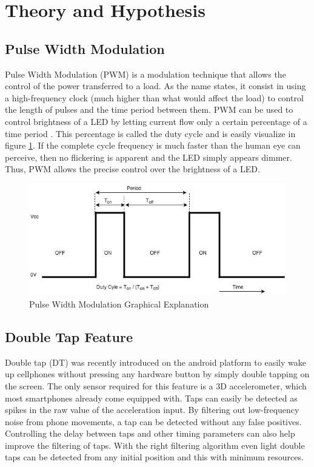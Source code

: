 \documentclass[12pt]{article}
\begin{document}
\section{Theory and Hypothesis}
\subsection{Pulse Width Modulation}
Pulse Width Modulation (PWM) is a modulation technique that allows the control of the power transferred to a load. As the name states, it consist in using a high-frequency clock (much higher than what would affect the load) to control the length of pulses and the time period between them. PWM can be used to control brightness of a LED by letting current flow only a certain percentage of a time period \cite{PWMLED}. This percentage is called the duty cycle and is easily visualize in figure \ref{fig:pwm}. If the complete cycle frequency is much faster than the human eye can perceive, then no flickering is apparent and the LED simply appears dimmer. Thus, PWM allows the precise control over the brightness of a LED.

\begin{figure}[!htb]
  \centering
  \includegraphics[scale=0.65]{images/PWM.png}
  \caption{Pulse Width Modulation Graphical Explanation}
  \label{fig:pwm}
 \end{figure}

\subsection{Double Tap Feature}
Double tap (DT) was recently introduced on the android platform to easily wake up cellphones without pressing any hardware button by simply double tapping on the screen. The only sensor required for this feature is a 3D accelerometer, which most smartphones already come equipped with. Taps can easily be detected as spikes in the raw value of the acceleration input. By filtering out low-frequency noise from phone movements, a tap can be detected without any false positives. Controlling the delay between taps and other timing parameters can also help improve the filtering of taps. With the right filtering algorithm even light double taps can be detected from any initial position and this with minimum resources.
\end{document}
